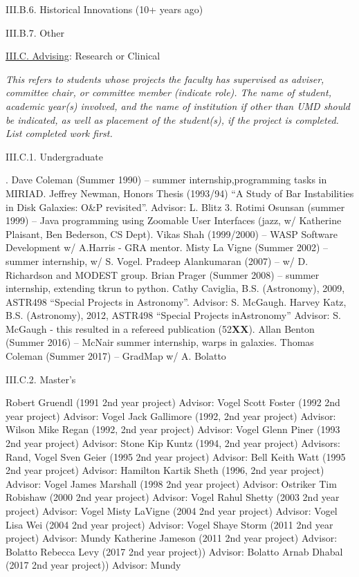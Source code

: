 \documentclass[11pt,letterpaper]{article}
\newcommand{\newi}{\newline\indent}
\begin{document}
III.B.6. Historical Innovations (10+ years ago)

III.B.7. Other


\underline{III.C. Advising}: Research or Clinical

\textit{This refers to students whose projects the faculty has supervised as adviser, committee chair, or committee member (indicate role). The name of student, academic year(s) involved, and the name of institution if other than UMD should be indicated, as well as placement of the student(s), if the project is completed.  List completed work first.}

III.C.1. Undergraduate

. Dave Coleman (Summer 1990) -- summer internship,programming tasks in MIRIAD\newi
2. Jeffrey Newman, Honors Thesis (1993/94) ``A Study of Bar Instabilities in Disk Galaxies: O\&P revisited''. Advisor: L. Blitz
3. Rotimi Osunsan (summer 1999) -- Java programming using Zoomable User Interfaces (jazz, w/ Katherine Plaisant, Ben Bederson, CS Dept)\newi
4. Vikas Shah (1999/2000) -- WASP Software Development w/ A.Harris - GRA mentor\newi
5. Misty La Vigne (Summer 2002) -- summer internship, w/ S. Vogel\newi
6. Pradeep Alankumaran (2007) -- w/ D. Richardson and MODEST group\newi
7. Brian Prager (Summer 2008) -- summer internship, extending tkrun to python\newi
8. Cathy Caviglia, B.S. (Astronomy), 2009,  ASTR498 ``Special Projects in Astronomy''.  Advisor:  S. McGaugh\newi
9. Harvey Katz, B.S. (Astronomy), 2012,  ASTR498  ``Special Projects inAstronomy''
 Advisor:  S. McGaugh -  this resulted in a refereed publication (52{\bf XX})\newi
10. Allan Benton (Summer 2016) -- McNair summer internship, warps in galaxies\newi
11. Thomas Coleman (Summer 2017) -- GradMap w/ A. Bolatto\newi

          
III.C.2. Master's


Robert Gruendl (1991 2nd year project) Advisor:  Vogel\newi
Scott Foster (1992 2nd year project) Advisor:  Vogel\newi
Jack Gallimore (1992, 2nd year project) Advisor:  Wilson\newi
Mike Regan (1992, 2nd year project) Advisor: Vogel\newi
Glenn Piner (1993 2nd year project) Advisor: Stone\newi
Kip Kuntz (1994, 2nd year project) Advisors:  Rand, Vogel\newi
Sven Geier (1995 2nd year project) Advisor: Bell\newi
Keith Watt (1995 2nd year projcet) Advisor:  Hamilton\newi
Kartik Sheth (1996, 2nd year project) Advisor:  Vogel\newi
James Marshall (1998 2nd year project) Advisor:  Ostriker\newi
Tim Robishaw (2000  2nd year project)  Advisor:  Vogel\newi
Rahul Shetty (2003  2nd year project) Advisor:  Vogel\newi
Misty LaVigne (2004 2nd year project) Advisor: Vogel\newi
Lisa Wei (2004 2nd year project) Advisor: Vogel\newi
Shaye Storm (2011 2nd year project) Advisor: Mundy\newi
Katherine Jameson  (2011 2nd year project) Advisor: Bolatto\newi
Rebecca Levy (2017 2nd year project)) Advisor:  Bolatto\newi
Arnab Dhabal (2017 2nd year project)) Advisor: Mundy\newi
                
\end{document}
